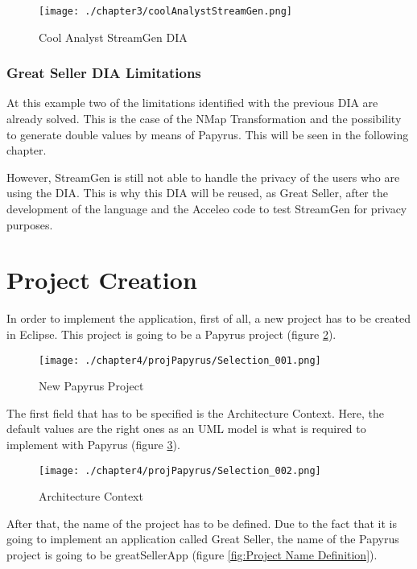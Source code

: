 \begin{figure}
\centering
{\texttt{[image: ./chapter3/coolAnalystStreamGen.png]}}
\caption{Cool Analyst StreamGen DIA}
\label{fig:Cool Analyst StreamGen DIA}
\end{figure}

\subsubsection*{Great Seller DIA Limitations}

At this example two of the limitations identified with the previous DIA are already solved. This is the case of the NMap Transformation and the possibility to generate double values by means of Papyrus. This will be seen in the following chapter.

However, StreamGen is still not able to handle the privacy of the users who are using the DIA. This is why this DIA will be reused, as Great Seller, after the development of the language and the Acceleo code to test StreamGen for privacy purposes.

\section{Project Creation}

In order to implement the application, first of all, a new project has to be created in Eclipse. This project is going to be a Papyrus project (figure \ref{fig:Papyrus Project}).

\begin{figure}
\centering
{\texttt{[image: ./chapter4/projPapyrus/Selection\_001.png]}}
\caption{New Papyrus Project}
\label{fig:Papyrus Project}
\end{figure}

The first field that has to be specified is the Architecture Context. Here, the default values are the right ones as an UML model is what is required to implement with Papyrus (figure \ref{fig:Architecture Context}).

\begin{figure}
\centering
{\texttt{[image: ./chapter4/projPapyrus/Selection\_002.png]}}
\caption{Architecture Context}
\label{fig:Architecture Context}
\end{figure}

After that, the name of the project has to be defined. Due to the fact that it is going to implement an application called Great Seller, the name of the Papyrus project is going to be greatSellerApp (figure \ref{fig:Project Name Definition}).

